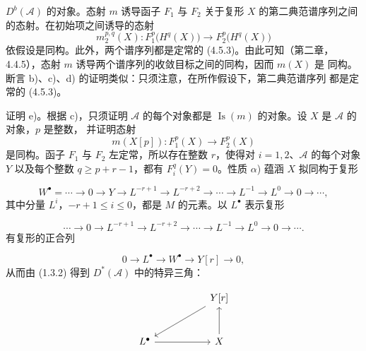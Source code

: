 \clearpage
{}%
\begingroup\small\setlength{\parskip}{0pt}\setlength{\emergencystretch}{1.5em}
\setlength{\abovedisplayskip}{4pt plus 2pt minus 2pt}%
\setlength{\belowdisplayskip}{4pt plus 2pt minus 2pt}%

\noindent $D^b(\mathcal A)$ 的对象。态射 $m$ 诱导函子 $F_1$ 与 $F_2$
关于复形 $X$ 的第二典范谱序列之间的态射。在初始项之间诱导的态射
\[
m_2^{p,q}(X)\colon F_1^p\bigl(H^q(X)\bigr)
\longrightarrow F_2^p\bigl(H^q(X)\bigr)
\]
依假设是同构。此外，两个谱序列都是定常的 (4.5.3)。由此可知（第二章，
4.4.5），态射 $m$ 诱导两个谱序列的收敛目标之间的同构，因而 $m(X)$ 是
同构。断言 b)、c)、d) 的证明类似：只须注意，在所作假设下，第二典范谱序列
都是定常的 (4.5.3)。

证明 e)。根据 c)，只须证明 $\mathcal A$ 的每个对象都是
$\operatorname{Is}(m)$ 的对象。设 $X$ 是 $\mathcal A$ 的对象，$p$ 是整数，
并证明态射
\[
m(X[p])\colon F_1^p(X)\longrightarrow F_2^p(X)
\]
是同构。函子 $F_1$ 与 $F_2$ 左定常，所以存在整数 $r$，使得对
$i=1,2$、$\mathcal A$ 的每个对象 $Y$ 以及每个整数 $q\geq p+r-1$，都有
$F_i^q(Y)=0$。性质 $\alpha$) 蕴涵 $X$ 拟同构于复形

\[
W^\bullet=
\cdots\longrightarrow0\longrightarrow Y\longrightarrow L^{-r+1}
\longrightarrow L^{-r+2}\longrightarrow\cdots\longrightarrow L^{-1}
\longrightarrow L^0\longrightarrow0\longrightarrow\cdots,
\]
其中分量 $L^i$，$-r+1\leq i\leq0$，都是 $M$ 的元素。以 $L^\bullet$
表示复形

\[
\cdots\longrightarrow0\longrightarrow L^{-r+1}
\longrightarrow L^{-r+2}\longrightarrow\cdots\longrightarrow L^{-1}
\longrightarrow L^0\longrightarrow0\longrightarrow\cdots.
\]
有复形的正合列

\[
0\longrightarrow L^\bullet\longrightarrow W^\bullet
\longrightarrow Y[r]\longrightarrow0,
\]
从而由 (1.3.2) 得到 $D^*(\mathcal A)$ 中的特异三角：

\[
\begin{tikzcd}[column sep=5.2em,row sep=2.8em]
{} & Y[r] \arrow[dl] \\
L^\bullet \arrow[r] & X \arrow[u]
\end{tikzcd}
\]
\endgroup
